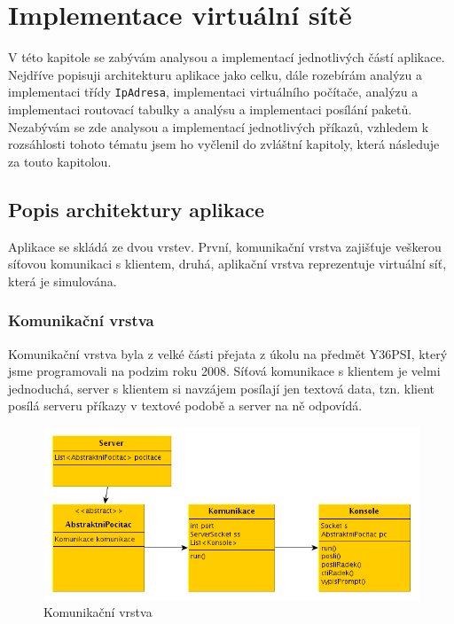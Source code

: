 
\chapter{Implementace virtuální sítě}

V této kapitole se zabývám analysou a implementací jednotlivých částí aplikace. Nejdříve popisuji architekturu aplikace jako celku, dále rozebírám analýzu a implementaci třídy \verb|IpAdresa|, implementaci virtuálního počítače, analýzu a implementaci routovací tabulky a analýsu a implementaci posílání paketů. Nezabývám se zde analysou a implementací jednotlivých příkazů, vzhledem k rozsáhlosti tohoto tématu jsem ho vyčlenil do zvláštní kapitoly, která následuje za touto kapitolou.




\section{Popis architektury aplikace}

Aplikace se skládá ze dvou vrstev. První, komunikační vrstva zajišťuje veškerou síťovou komunikaci s klientem, druhá, aplikační vrstva reprezentuje virtuální síť, která je simulována. 


\subsection{Komunikační vrstva}

Komunikační vrstva byla z velké části přejata z úkolu na předmět Y36PSI, který jsme programovali na podzim roku 2008. Síťová komunikace s klientem je velmi jednoduchá, server s klientem si navzájem posílají jen textová data, tzn. klient posílá serveru příkazy v textové podobě a server na ně odpovídá.

\begin{figure}[h]
\begin{center}
\includegraphics[width=14cm]{obrazky/komunikacni_vrstva}
\caption{Komunikační vrstva}
\label{obr_komunikacni_vrstva}
\end{center}
\end{figure}

